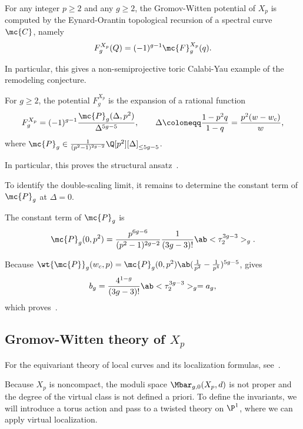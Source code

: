 \begin{thm}%
\label{thm:local P1 mirror symmetry}
    For any integer \(p \geq 2\) and any \(g \geq 2\), the Gromov-Witten potential of \(X_p\) is computed by the Eynard-Orantin topological recursion of a spectral curve \(\mc{C}\), namely
    \[ F_g^{X_p}(Q) = (-1)^{g-1}\mc{F}_g^{X_p}(q). \]
\end{thm}

In particular, this gives a non-semiprojective toric Calabi-Yau example of the remodeling conjecture.

\begin{thm}%
\label{thm:local P1 rationality}
    For \(g \geq 2\), the potential \(F_g^{X_p}\) is the expansion of a rational function
    \[ F_g^{X_p} = (-1)^{g-1}\frac{\mc{P}_g(\Delta,p^2)}{\Delta^{5g-5}}, \qquad \Delta \coloneqq \frac{1-p^2q}{1-q} = \frac{p^2(w-w_c)}{w}, \]
    where \(\mc{P}_g \in \frac{1}{(p^2-1)^{2g-2}}\Q[p^2][\Delta]_{\leq 5g-5}\).
\end{thm}

In particular, this proves the structural ansatz~.

To identify the double-scaling limit, it remains to determine the constant term of \(\mc{P}_g\) at \(\Delta = 0\).

\begin{thm}%
\label{thm:local P1 constant term}
    The constant term of \(\mc{P}_g\) is
    \[ \mc{P}_g(0,p^2) = \frac{p^{6g-6}}{(p^2-1)^{2g-2}}\frac{1}{(3g-3)!}\ab<\tau_2^{3g-3}>_g. \]
\end{thm}

Because \(\wt{\mc{P}}_g(w_c,p) = \mc{P}_g(0,p^2)\ab(\frac{1}{p^2}-\frac{1}{p^4})^{5g-5}\),  gives
\[ b_g = \frac{4^{1-g}}{(3g-3)!}\ab<\tau_2^{3g-3}>_g = a_g, \]
which proves~.

\subsection{Gromov-Witten theory of \(X_p\)}%
\label{sub:Gromov-Witten theory of Xp}

For the equivariant theory of local curves and its localization formulas, see~\cite{BryanPandharipande2008}.

Because \(X_p\) is noncompact, the moduli space \(\Mbar_{g,0}(X_p,d)\) is not proper and the degree of the virtual class is not defined a priori. To define the invariants, we will introduce a torus action and pass to a twisted theory on \(\P^1\), where we can apply virtual localization.

